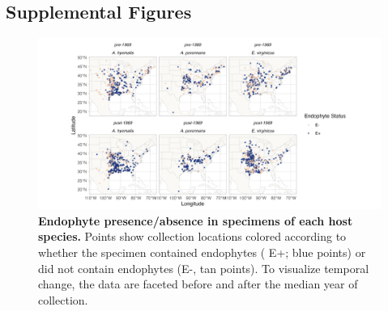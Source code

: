 \documentclass[11pt]{article}
\newcommand{\firstrevise}[1]{{\color{black}{#1}}}
\begin{document}
	\subsection*{Supplemental Figures}
	\begin{figure}[H]
		\centering
		\includegraphics[width =\linewidth]{../Plots/endo_status_map.png}
		\caption[Endophyte presence/absence in specimens of each host species]{\textbf{Endophyte presence/absence in specimens of each host species.} Points show collection locations colored according to whether the specimen contained endophytes ( E+; blue points) or did not contain endophytes (E-, tan points). To visualize temporal change, the data are faceted before and after the median year of collection. \firstrevise{Map lines delineate study areas and do not necessarily depict accepted national boundaries.}}
		\label{fig:endo_status_map}
	\end{figure}
	
\end{document}
